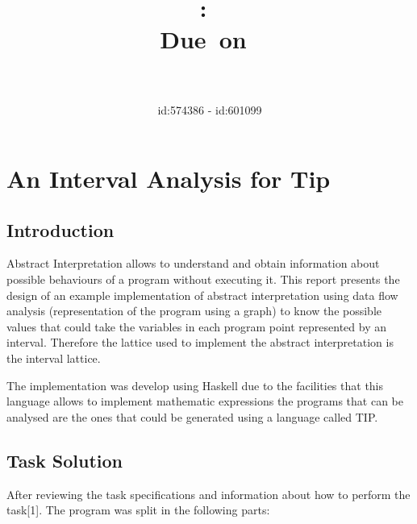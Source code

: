 \documentclass{article}
\title{
\vspace{2in}
\textmd{\textbf{\hmwkClass:\ \hmwkTitle}}\\
\normalsize\vspace{0.1in}\small{Due\ on\ \hmwkDueDate}\\
\vspace{0.1in}\large{\textit{\hmwkClassInstructor\ \hmwkClassTime}}
\vspace{3in}
}
\author{\textbf{\hmwkAuthorName} id:574386 - id:601099}
\date{} %
\begin{document}
\maketitle


\newpage
\newpage

\section{An Interval Analysis for Tip}

\subsection{Introduction}

Abstract Interpretation allows to understand and obtain information about possible
behaviours of a program without executing it. This report presents the design of
an example implementation of abstract interpretation using data flow analysis
(representation of the program using a graph) to know the possible values that could
take the variables in each program point represented by an interval. Therefore the
lattice used to implement the abstract interpretation is the interval lattice.

The implementation was develop using Haskell due to the facilities that this language
allows to implement mathematic expressions the programs that can be analysed are the
ones that could be generated using a language called TIP.


\subsection{Task Solution}
After reviewing the task specifications and information about how to perform the
task[1]. The program was split in the following parts:

\end{document}
